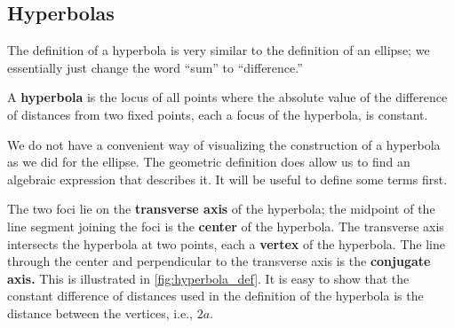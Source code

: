 %
%
%
%

\subsection*{Hyperbolas}

The definition of a hyperbola is very similar to the definition of an ellipse; we essentially just change the word ``sum'' to ``difference.''

{A \textbf{hyperbola} is the locus of all points where the absolute value of the difference of distances from two fixed points, each a focus of the hyperbola, is constant.
}

We do not have a convenient way of visualizing the construction of a hyperbola as we did for the ellipse. The geometric definition does allow us to find an algebraic expression that describes it. It will be useful to define some terms first.


The two foci lie on the \textbf{transverse axis} of the hyperbola; the midpoint of the line segment joining the foci is the \textbf{center} of the hyperbola. The transverse axis intersects the hyperbola at two points, each a \textbf{vertex} of the hyperbola. The line through the center and perpendicular to the transverse axis is the \textbf{conjugate axis.} This is illustrated in \autoref{fig:hyperbola_def}. It is easy to show that the constant difference of distances used in the definition of the hyperbola is the distance between the vertices, i.e., $2a$.

